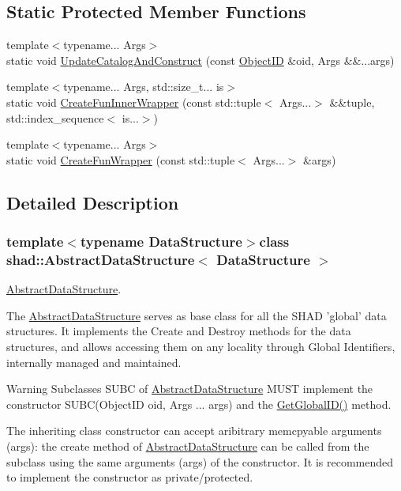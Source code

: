 \subsection*{Static Protected Member Functions}
\begin{DoxyCompactItemize}
\item 
{\footnotesize template$<$typename... Args$>$ }\\static void \hyperlink{classshad_1_1AbstractDataStructure_aad7fd98b646c82cc02a4ea968e11c60e}{Update\-Catalog\-And\-Construct} (const \hyperlink{classshad_1_1AbstractDataStructure_a8772079d2686692828cfbf342cc2b594}{Object\-I\-D} \&oid, Args \&\&...args)
\item 
{\footnotesize template$<$typename... Args, std\-::size\-\_\-t... is$>$ }\\static void \hyperlink{classshad_1_1AbstractDataStructure_a40bb2c090ed3c4a45b24571f62552ac6}{Create\-Fun\-Inner\-Wrapper} (const std\-::tuple$<$ Args...$>$ \&\&tuple, std\-::index\-\_\-sequence$<$ is...$>$)
\item 
{\footnotesize template$<$typename... Args$>$ }\\static void \hyperlink{classshad_1_1AbstractDataStructure_a7bdbfcd38052daa7e1dc7f27a7a0fdf2}{Create\-Fun\-Wrapper} (const std\-::tuple$<$ Args...$>$ \&args)
\end{DoxyCompactItemize}


\subsection{Detailed Description}
\subsubsection*{template$<$typename Data\-Structure$>$class shad\-::\-Abstract\-Data\-Structure$<$ Data\-Structure $>$}

\hyperlink{classshad_1_1AbstractDataStructure}{Abstract\-Data\-Structure}. 

The \hyperlink{classshad_1_1AbstractDataStructure}{Abstract\-Data\-Structure} serves as base class for all the S\-H\-A\-D 'global' data structures. It implements the Create and Destroy methods for the data structures, and allows accessing them on any locality through Global Identifiers, internally managed and maintained.

\begin{DoxyWarning}{Warning}
Subclasses S\-U\-B\-C of \hyperlink{classshad_1_1AbstractDataStructure}{Abstract\-Data\-Structure} M\-U\-S\-T implement the constructor S\-U\-B\-C(Object\-I\-D oid, Args ... args) and the \hyperlink{classshad_1_1AbstractDataStructure_a914a6e24eec3a7f5d51d93323d3a39cc}{Get\-Global\-I\-D()} method.
\end{DoxyWarning}
The inheriting class constructor can accept aribitrary memcpyable arguments (args)\-: the create method of \hyperlink{classshad_1_1AbstractDataStructure}{Abstract\-Data\-Structure} can be called from the subclass using the same arguments (args) of the constructor. It is recommended to implement the constructor as private/protected.


